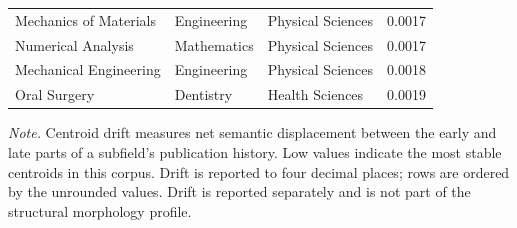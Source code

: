 \begin{table}[H]
\begin{tabular}{@{}p{}p{}p{}r@{}}
Mechanics of Materials & Engineering & Physical Sciences & 0.0017 \\[0.12cm]
Numerical Analysis & Mathematics & Physical Sciences & 0.0017 \\[0.12cm]
Mechanical Engineering & Engineering & Physical Sciences & 0.0018 \\[0.12cm]
Oral Surgery & Dentistry & Health Sciences & 0.0019 \\[0.12cm]
\hline
\end{tabular}
\par\vspace{0.12cm}
\footnotesize\textit{Note.} Centroid drift measures net semantic displacement between the early and late parts of a subfield's publication history. Low values indicate the most stable centroids in this corpus. Drift is reported to four decimal places; rows are ordered by the unrounded values. Drift is reported separately and is not part of the structural morphology profile.
\end{table}
